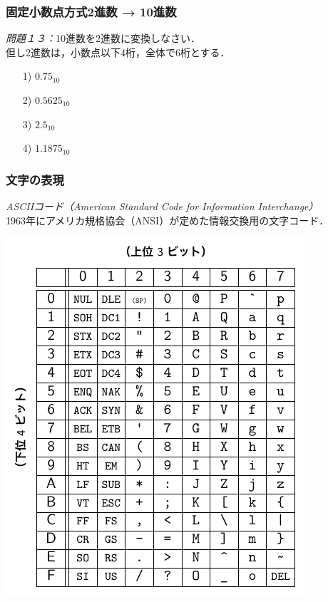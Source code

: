 \documentclass[handout]{beamer}        %
\begin{document}
\begin{frame}
  \frametitle{固定小数点方式2進数 →  10進数}
  \emph{問題１３：}10進数を2進数に変換しなさい．\\
       但し2進数は，小数点以下4桁，全体で6桁とする．
       \vfill
  \begin{enumerate}
  \item[1)] $0.75_{10}$
  \vfill
  \item[2)] $0.5625_{10}$
  \vfill
  \item[3)] $2.5_{10}$
  \vfill
  \item[4)] $1.1875_{10}$
  \end{enumerate}
\end{frame}

\begin{frame}
  \frametitle{文字の表現}
  \emph{ASCIIコード（American Standard Code for Information Interchange）}\\
  1963年にアメリカ規格協会（ANSI）が定めた情報交換用の文字コード．

  \centerline{\includegraphics[scale=0.80]{../Tikz/ascii.pdf}}

\end{frame}
\end{document}
